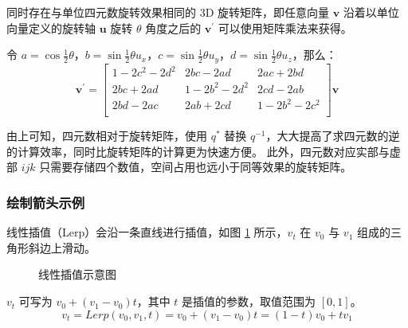 同时存在与单位四元数旋转效果相同的 3D 旋转矩阵，即任意向量 $\mathbf{v}$ 沿着以单位向量定义的旋转轴 $\mathbf{u}$ 旋转 $\theta$ 角度之后的 $\mathbf{v}^{'}$ 可以使用矩阵乘法来获得。

令 $a=\cos{\frac{1}{2}\theta}$，$b=\sin{\frac{1}{2}\theta}u_x$，$c=\sin{\frac{1}{2}\theta}u_y$，$d=\sin{\frac{1}{2}\theta}u_z$，那么：
\begin{equation}
  \mathbf{v}^{'} = 
  \begin{bmatrix}
    1-2c^2-2d^2 & 2bc-2ad & 2ac+2bd \\
    2bc+2ad & 1-2b^2-2d^2 & 2cd-2ab \\
    2bd-2ac & 2ab+2cd & 1-2b^2-2c^2 \\
  \end{bmatrix}
  \mathbf{v}
\end{equation}

由上可知，四元数相对于旋转矩阵，使用 $q^*$ 替换 $q^{-1}$，大大提高了求四元数的逆的计算效率，同时比旋转矩阵的计算更为快速方便。
此外，四元数对应实部与虚部 $ijk$ 只需要存储四个数值，空间占用也远小于同等效果的旋转矩阵。

\subsubsection{绘制箭头示例}

线性插值（Lerp）会沿一条直线进行插值，如图 \ref{fig:lerp} 所示，$v_t$ 在 $v_0$ 与 $v_1$ 组成的三角形斜边上滑动。

\begin{figure}[htb]
  \centering
  \caption{线性插值示意图}
  \label{fig:lerp}
\end{figure}

$v_t$ 可写为 $v_0 + (v_1-v_0)t$，其中 $t$ 是插值的参数，取值范围为 $[0,1]$。
\begin{equation}
  v_t = Lerp(v_0, v_1,t) = v_0 + (v_1-v_0)t = (1-t)v_0+tv_1
\end{equation}

